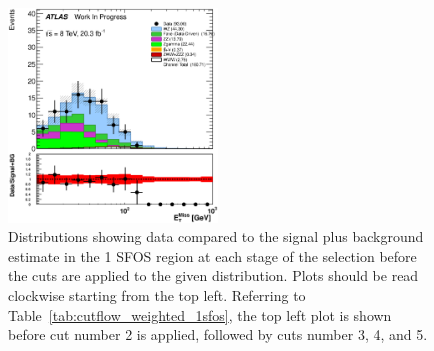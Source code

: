 \begin{figure}[ht!]
\includegraphics[width=0.495\textwidth]{figures/appendix_signal_selection/Nov24Update_FakeSys_KFacSys_LinearY_Rebin/output/jobs/MxM/DataFull_Rates_May13_FakeRatesExactly2Loose_MuonMxMBJetGt0_ElBJetGt0SubtractPC_MxM/PreselectionNov23_15_1SFOS_ChargeAbs1_BVeto85_ZVetoLow35High25GeV_physics/weight_all/eps/MET_Et_histratio.eps}


\caption{Distributions showing data compared to the signal plus background estimate in the 1 SFOS region at each stage 
of the selection before the cuts are applied to the given distribution. 
Plots should be read clockwise starting from the top left.
Referring to Table~\ref{tab:cutflow_weighted_1sfos}, the top left
plot is shown before cut number 2 is applied, followed by cuts
number 3, 4, and 5.}
\label{fig:1sfos_1}
\end{figure}

